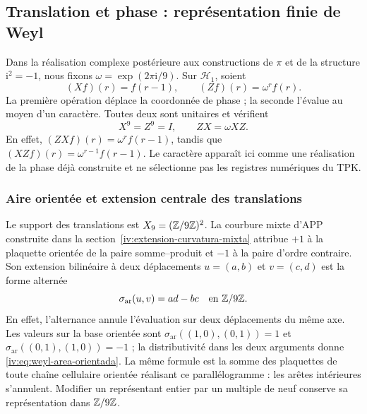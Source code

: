 \subsection{Translation et phase : représentation finie de Weyl}

Dans la réalisation complexe postérieure aux constructions de \(\pi\) et de la structure \(\mathrm i^2=-1\), nous fixons \(\omega=\exp(2\pi\mathrm i/9)\). Sur \(\mathcal H_1\), soient
\begin{equation}
 (Xf)(r)=f(r-1),\qquad (Zf)(r)=\omega^r f(r).
 \label{iv:eq:weyl-operadores}
\end{equation}
La première opération déplace la coordonnée de phase ; la seconde
l’évalue au moyen d’un caractère. Toutes deux sont unitaires et vérifient
\begin{equation}
 X^9=Z^9=I,\qquad ZX=\omega XZ.
 \label{iv:eq:weyl-relacion}
\end{equation}
En effet, \((ZXf)(r)=\omega^r f(r-1)\), tandis que \((XZf)(r)=\omega^{r-1}f(r-1)\). Le caractère apparaît ici comme une réalisation de la phase déjà construite et ne sélectionne pas les registres numériques du TPK.

\subsubsection{Aire orientée et extension centrale des translations}
\label{iv:weyl-area-extension}

Le support des translations est \(X_9=(\mathbb Z/9\mathbb Z)^2\).
La courbure mixte d’APP construite dans la
section~\ref{iv:extension-curvatura-mixta} attribue \(+1\) à la
plaquette orientée de la paire somme--produit et \(-1\) à la
paire d’ordre contraire. Son extension bilinéaire à deux déplacements
\(u=(a,b)\) et \(v=(c,d)\) est la forme alternée
\begin{equation}
 \sigma_{\mathrm{ar}}(u,v)=ad-bc\quad\text{en }\mathbb Z/9\mathbb Z.
 \label{iv:eq:weyl-area-orientada}
\end{equation}
En effet, l’alternance annule l’évaluation sur deux déplacements
du même axe. Les valeurs sur la base orientée sont
\(\sigma_{\mathrm{ar}}((1,0),(0,1))=1\) et
\(\sigma_{\mathrm{ar}}((0,1),(1,0))=-1\) ; la distributivité dans les deux
arguments donne \eqref{iv:eq:weyl-area-orientada}. La même formule est
la somme des plaquettes de toute chaîne cellulaire orientée réalisant
ce parallélogramme : les arêtes intérieures s’annulent. Modifier un
représentant entier par un multiple de neuf conserve sa représentation
dans \(\mathbb Z/9\mathbb Z\).


